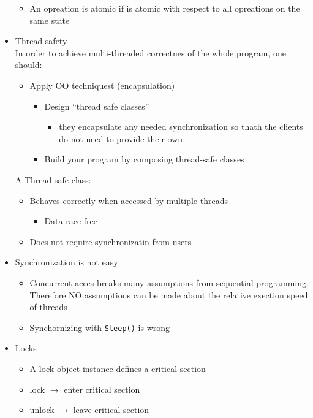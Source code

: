 \documentclass[a4paper]{article}
\newcommand{\inline}[1]{\lstinline!#1!}%
\begin{document}
\begin{itemize}
\begin{itemize}
\begin{itemize}
					\end{itemize}
				\item An opreation is atomic if is atomic with respect to all opreations on the same state
 			\end{itemize}	
 		\item Thread safety
 			\\In order to achieve multi-threaded correctnes of the whole program, one should:	
 			\begin{itemize}
 				\item Apply OO techniquest (encapsulation)
 					\begin{itemize}
 						\item Design ``thread safe classes''
 							\begin{itemize}
 								\item they encapsulate any needed synchronization so thath the clients do not need to provide their own
 							\end{itemize}
 						\item Build your program by composing thread-safe classes
 					\end{itemize}
 			\end{itemize}
 			A Thread safe class:
 				\begin{itemize}
 					\item Behaves correctly when accessed by multiple threads
 						\begin{itemize}
 							\item Data-race free
 						\end{itemize}
 					\item Does not require synchronizatin from users
 				\end{itemize}
 			\item Synchronization is not easy
 				\begin{itemize}
 					\item Concurrent acces breaks many assumptions from sequential programming. Therefore NO assumptions can be made about the relative exection speed of threads
 					\item Synchornizing with \inline{Sleep()} is wrong 
 				\end{itemize}
 			\item Locks
 				\begin{itemize}
 					\item A lock object instance defines a critical section
 					\item lock $\to$ enter critical section
 					\item unlock $\to$ leave critical section

\end{itemize}
\end{itemize}
\end{document}

